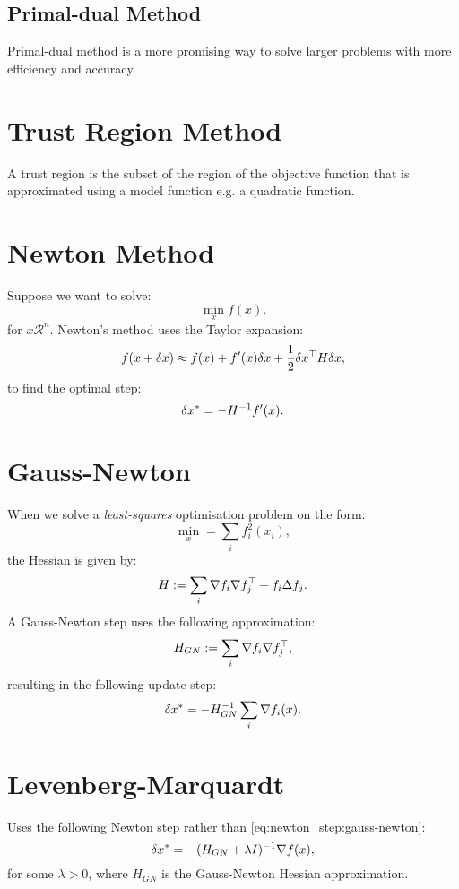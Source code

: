 \subsection{Primal-dual Method}
Primal-dual method is a more promising way to solve
larger problems with more efficiency and accuracy.


\section{Trust Region Method}

A trust region is the subset of the region of the objective function that
is approximated using a model function e.g. a quadratic function.


\section{Newton Method}

Suppose we want to solve:
\[
\min_x f(x).
\]
for $x\mathcal{R}^n$. Newton's method uses the Taylor expansion:
\[
f(x+\delta x) \approx f(x) + f'(x)\delta x + \frac{1}{2}\delta x^\top H\delta x,
\]
to find the optimal step:
\begin{equation}\label{eq:newton_step}
\delta x^* = - H^{-1} f'(x).
\end{equation}

\section{Gauss-Newton}

When we solve a \emph{least-squares} optimisation problem on the form:
\[
\min_x = \sum_i f_i^2(x_i),
\]
the Hessian  is given by:
\[
H := \sum_i \nabla f_i \nabla f_j^\top  + f_i \Delta f_j.
\]
A Gauss-Newton step uses the following approximation:
\[
H_{GN} := \sum_i \nabla f_i \nabla f_j^\top,
\]
resulting in the following update step:
\begin{equation}\label{eq:newton_step:gauss-newton}
\delta x^* = - H_{GN}^{-1} \sum_i \nabla f_i(x).
\end{equation}

\section{Levenberg-Marquardt}

Uses the following Newton step rather than \eqref{eq:newton_step:gauss-newton}:
\begin{equation}\label{eq:newton_step:lm}
\delta x^* = - (H_{GN} + \lambda I)^{-1} \nabla f(x),
\end{equation}
for some $\lambda>0$, where $H_{GN}$ is the Gauss-Newton Hessian approximation.

